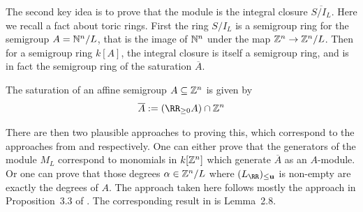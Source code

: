 \documentclass{amsart}
\begin{document}
The second key idea is to prove that the module is the integral closure $\overline{S/I_L}$. Here we recall a fact about toric rings. First the ring $S/I_L$ is a semigroup ring for the semigroup $A=\mathbb N^n/L$, that is the image of $\mathbb N^n$ under the map $\mathbb Z^n \rightarrow \mathbb Z^n/L$. Then for a semigroup ring $k[A]$, the integral closure is itself a semigroup ring, and is in fact the semigroup ring of the saturation $\overline{A}$.

The saturation of an affine semigroup $A\subseteq \mathbb Z^n$ is given by
\[\overline{A} := (\RR_{\geq 0}A)\cap \ZZ^n \]

There are then two plausible approaches to proving this, which correspond to the approaches from \cite{BCHSY} and \cite{BH25} respectively. One can either prove that the generators of the module $M_L$ correspond to monomials in $k[\mathbb Z^n]$ which generate $\overline{A}$ as an $A$-module. Or one can prove that those degrees $\alpha\in \mathbb Z^n/L$ where $(L_{\RR})_{\leq \mathbf{u}}$ is non-empty are exactly the degrees of $A$. The approach taken here follows mostly the approach in Proposition~3.3 of \cite{BCHSY}. The corresponding result in \cite{BH25} is Lemma~2.8.
\end{document}
